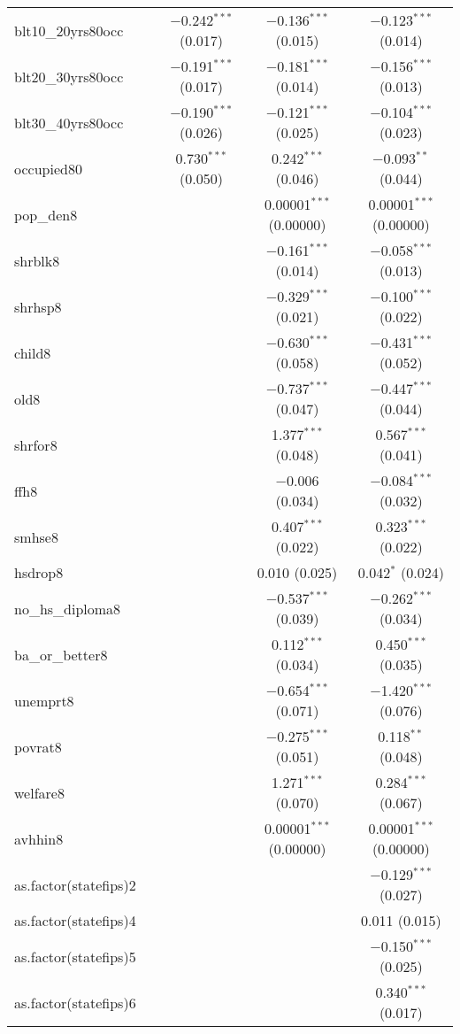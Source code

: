 \documentclass{article}
\begin{document}
\begin{table}[!htbp]
\begin{tabular}{@{\extracolsep{5pt}}lcccc}
  blt10\_20yrs80occ &  & $-$0.242$^{***}$ (0.017) & $-$0.136$^{***}$ (0.015) & $-$0.123$^{***}$ (0.014) \\ 
  blt20\_30yrs80occ &  & $-$0.191$^{***}$ (0.017) & $-$0.181$^{***}$ (0.014) & $-$0.156$^{***}$ (0.013) \\ 
  blt30\_40yrs80occ &  & $-$0.190$^{***}$ (0.026) & $-$0.121$^{***}$ (0.025) & $-$0.104$^{***}$ (0.023) \\ 
  occupied80 &  & 0.730$^{***}$ (0.050) & 0.242$^{***}$ (0.046) & $-$0.093$^{**}$ (0.044) \\ 
  pop\_den8 &  &  & 0.00001$^{***}$ (0.00000) & 0.00001$^{***}$ (0.00000) \\ 
  shrblk8 &  &  & $-$0.161$^{***}$ (0.014) & $-$0.058$^{***}$ (0.013) \\ 
  shrhsp8 &  &  & $-$0.329$^{***}$ (0.021) & $-$0.100$^{***}$ (0.022) \\ 
  child8 &  &  & $-$0.630$^{***}$ (0.058) & $-$0.431$^{***}$ (0.052) \\ 
  old8 &  &  & $-$0.737$^{***}$ (0.047) & $-$0.447$^{***}$ (0.044) \\ 
  shrfor8 &  &  & 1.377$^{***}$ (0.048) & 0.567$^{***}$ (0.041) \\ 
  ffh8 &  &  & $-$0.006 (0.034) & $-$0.084$^{***}$ (0.032) \\ 
  smhse8 &  &  & 0.407$^{***}$ (0.022) & 0.323$^{***}$ (0.022) \\ 
  hsdrop8 &  &  & 0.010 (0.025) & 0.042$^{*}$ (0.024) \\ 
  no\_hs\_diploma8 &  &  & $-$0.537$^{***}$ (0.039) & $-$0.262$^{***}$ (0.034) \\ 
  ba\_or\_better8 &  &  & 0.112$^{***}$ (0.034) & 0.450$^{***}$ (0.035) \\ 
  unemprt8 &  &  & $-$0.654$^{***}$ (0.071) & $-$1.420$^{***}$ (0.076) \\ 
  povrat8 &  &  & $-$0.275$^{***}$ (0.051) & 0.118$^{**}$ (0.048) \\ 
  welfare8 &  &  & 1.271$^{***}$ (0.070) & 0.284$^{***}$ (0.067) \\ 
  avhhin8 &  &  & 0.00001$^{***}$ (0.00000) & 0.00001$^{***}$ (0.00000) \\ 
  as.factor(statefips)2 &  &  &  & $-$0.129$^{***}$ (0.027) \\ 
  as.factor(statefips)4 &  &  &  & 0.011 (0.015) \\ 
  as.factor(statefips)5 &  &  &  & $-$0.150$^{***}$ (0.025) \\ 
  as.factor(statefips)6 &  &  &  & 0.340$^{***}$ (0.017) \\ 

\end{tabular}
\end{table}
\end{document}
